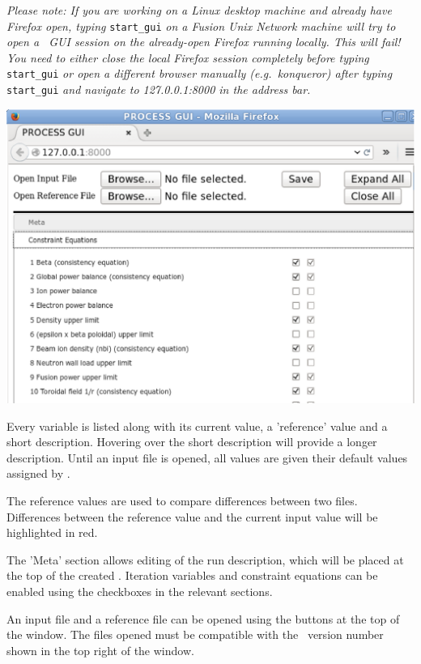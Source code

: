 \textit{Please note: If you are working on a Linux desktop machine and already
  have Firefox open, typing} \verb+start_gui+ \textit{on a Fusion Unix Network
  machine will try to open a \process\ GUI session on the already-open Firefox
  running locally. This will fail! You need to either close the local Firefox
  session completely before typing} \verb+start_gui+ \textit{or open a
  different browser manually (e.g.\ konqueror) after typing} \verb+start_gui+
\textit{and navigate to 127.0.0.1:8000 in the address bar.}



\includegraphics[scale=1]{gui.eps}

Every variable is listed along with its current value, a 'reference'
value and a short description. Hovering over the short description will
provide a longer description. Until an input file is opened, all values are given their default values assigned by \process.

The reference values are used to compare differences between two files.
Differences between the reference value and the current input value will be
highlighted in red.

The 'Meta' section allows editing of the run description, which will be placed at the top of the created \indat. Iteration variables and constraint equations can be enabled using the checkboxes in the relevant sections.

An input file and a reference file can be opened using the buttons at the top
of the window. The files opened must be compatible with the \process\ version
number shown in the top right of the window.

